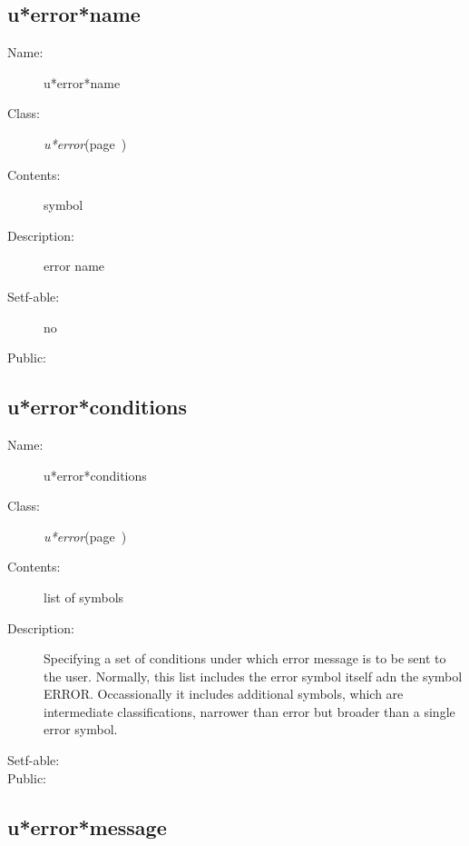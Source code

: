\subsection{u*error*name}
\label{u*error*name}

\begin{description}
\item [Name:]  u*error*name

\item [Class:]
{\sl u*error}\hfill(page~\pageref{u*error})

\item [Contents:] symbol 

\item [Description:]  error name

\item [Setf-able:] no

\item [Public:]



\end{description}
\horizontalline

\subsection{u*error*conditions}
\label{u*error*conditions}

\begin{description}
\item [Name:]  u*error*conditions

\item [Class:]
{\sl u*error}\hfill(page~\pageref{u*error})

\item [Contents:] list of symbols

\item [Description:] 
Specifying a set of conditions under which error
message is to be sent to the user. Normally, this
list includes the error symbol itself adn the symbol
ERROR. Occassionally it includes additional symbols,
which are intermediate classifications, narrower than
error but broader than a single error symbol.

\item [Setf-able:]

\item [Public:]



\end{description}
\horizontalline

\subsection{u*error*message}
\label{u*error*message}

